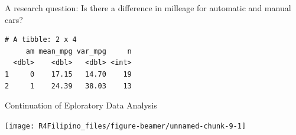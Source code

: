 \begin{frame}[fragile]{A research question: Is there a difference in
milleage for automatic and manual cars?}

\begin{Shaded}
\end{Shaded}

\begin{verbatim}
# A tibble: 2 x 4
     am mean_mpg var_mpg     n
  <dbl>    <dbl>   <dbl> <int>
1     0    17.15   14.70    19
2     1    24.39   38.03    13
\end{verbatim}

\end{frame}

\begin{frame}[fragile]{Continuation of Eploratory Data Analysis}

\begin{Shaded}
\begin{Highlighting}[]
\OperatorTok{~}
\end{Highlighting}
\end{Shaded}

\begin{center}\texttt{[image: R4Filipino\_files/figure-beamer/unnamed-chunk-9-1]} \end{center}

\end{frame}

